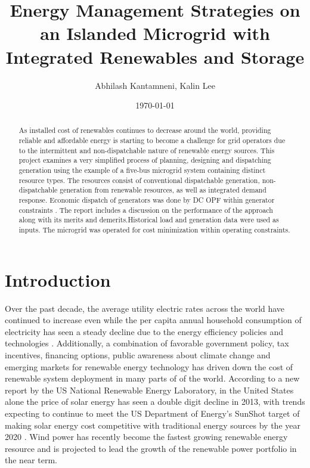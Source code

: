 \documentclass[a4paper]{article}
\title{Energy Management Strategies on an Islanded Microgrid with Integrated Renewables and Storage}
\author{Abhilash Kantamneni, Kalin Lee}
\date{\today}
\begin{document}
\maketitle

\begin{abstract}


As installed cost of renewables continues to decrease around the world, providing reliable and affordable energy is starting to become a challenge for grid operators due to the intermittent and non-dispatchable nature of renewable energy sources. This project examines a very simplified process of planning, designing and dispatching generation using the example of a five-bus microgrid system containing distinct resource types. The resources consist of conventional dispatchable generation, non-dispatchable generation from renewable resources, as well as integrated demand response. Economic dispatch of generators was done by DC OPF within generator constraints . The report includes a discussion on the performance of the approach along with its merits and demerits.Historical load and generation data were used as inputs. The microgrid was operated for cost minimization within operating constraints.
\end{abstract}



\section{Introduction}

Over the past decade, the average utility electric rates across the world have continued to increase even while the per capita annual household consumption of electricity has seen a steady decline due to the energy efficiency policies and technologies \cite{simshauser2012energy}. Additionally, a combination of favorable government policy, tax incentives, financing options, public awareness about climate change and emerging markets for renewable energy technology has driven down the cost of renewable system deployment in many parts of of the world. According to a new report\cite{feldman2014photovoltaic} by the US National Renewable Energy Laboratory, in the United States alone the price of solar energy has seen a double digit decline in 2013, with trends expecting to continue to meet the US Department of Energy's SunShot target of making solar energy cost competitive with traditional energy sources by the year 2020 \cite{sunshotus}. Wind power has recently become the fastest growing renewable energy resource and is projected to lead the growth of the renewable power portfolio in the near term\cite{tarroja2012metrics}.
\end{document}
